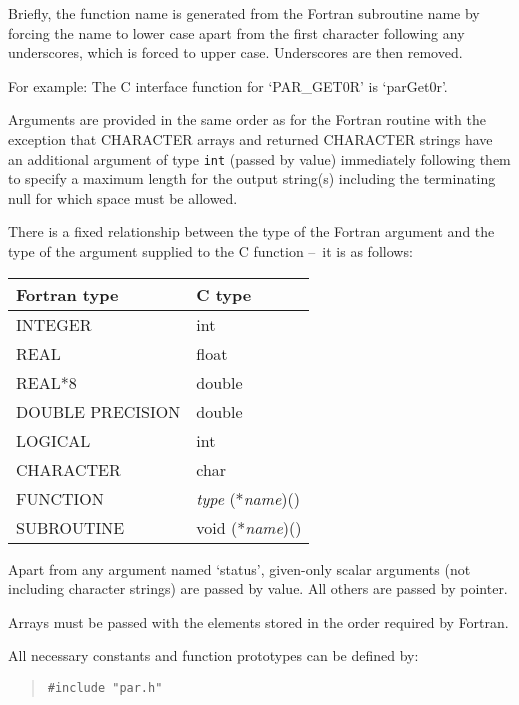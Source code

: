 \documentclass[twoside,11pt]{article}
\newcommand{\dash}{--}
\newcommand{\dash}{-}
\begin{document}
Briefly, the function name is generated from the Fortran subroutine name by
forcing the name to lower case apart from the first character following any
underscores, which is forced to upper case. Underscores are then removed.

For example: The C interface function for `PAR\_GET0R' is `parGet0r'.

Arguments are provided in the same order as for the Fortran routine with the
exception that CHARACTER arrays and returned CHARACTER strings 
have an additional argument of type \texttt{int} (passed by value) immediately 
following them to specify a maximum length for the output string(s) including 
the terminating null for which space must be allowed. 

There is a fixed relationship between the type of the Fortran 
argument and the type of the argument supplied to the C function \dash\ it is 
as follows:
\begin{center}
\begin{tabular}{|l|l|}
\hline
Fortran type & C type \\
\hline
INTEGER & int \\
REAL & float \\
REAL*8 & double \\
DOUBLE PRECISION & double \\
LOGICAL & int \\
CHARACTER & char \\
FUNCTION & \textit{type} (*\textit{name})() \\
SUBROUTINE & void (*\textit{name})() \\
\hline
\end{tabular}
\end{center}

Apart from any argument named `status', given-only scalar arguments (not
including character strings) are passed by value. 
All others are passed by pointer.

Arrays must be passed with the elements stored in the order required by Fortran.

All necessary constants and function prototypes can be defined by:
\begin{quote} \begin{verbatim}
#include "par.h"
\end{verbatim} \end{quote}
\end{document}

